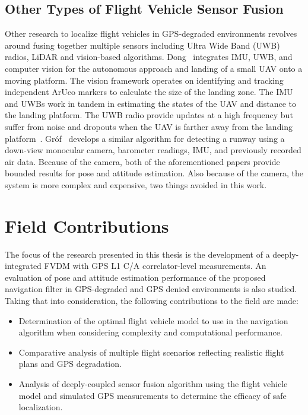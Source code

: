 \subsection{\textbf{Other Types of Flight Vehicle Sensor Fusion}}
Other research to localize flight vehicles in GPS-degraded environments revolves around fusing together multiple sensors including Ultra Wide Band (UWB) radios, LiDAR and vision-based algorithms. Dong~\cite{dongIntegratedUWBIMUVisionFramework2022} integrates IMU, UWB, and computer vision for the autonomous approach and landing of a small UAV onto a moving platform. The vision framework operates on identifying and tracking independent ArUco markers to calculate the size of the landing zone. The IMU and UWBs work in tandem in estimating the states of the UAV and distance to the landing platform. The UWB radio provide updates at a high frequency but suffer from noise and dropouts when the UAV is farther away from the landing platform~\cite{dongIntegratedUWBIMUVisionFramework2022}. Gr\'of~\cite{grofPositioningAircraftRelative2022} develops a similar algorithm for detecting a runway using a down-view monocular camera, barometer readings, IMU, and previously recorded air data. Because of the camera, both of the aforementioned papers provide bounded results for pose and attitude estimation. Also because of the camera, the system is more complex and expensive, two things avoided in this work.

\section{\textbf{Field Contributions}}
The focus of the research presented in this thesis is the development of a deeply-integrated FVDM with GPS L1 C/A correlator-level measurements. An evaluation of pose and attitude estimation performance of the proposed navigation filter in GPS-degraded and GPS denied environments is also studied. Taking that into consideration, the following contributions to the field are made:
\begin{itemize}
    \item Determination of the optimal flight vehicle model to use in the navigation algorithm when considering complexity and computational performance.
    \item Comparative analysis of multiple flight scenarios reflecting realistic flight plans and GPS degradation.
    \item Analysis of deeply-coupled sensor fusion algorithm using the flight vehicle model and simulated GPS measurements to determine the efficacy of safe localization.
\end{itemize}

